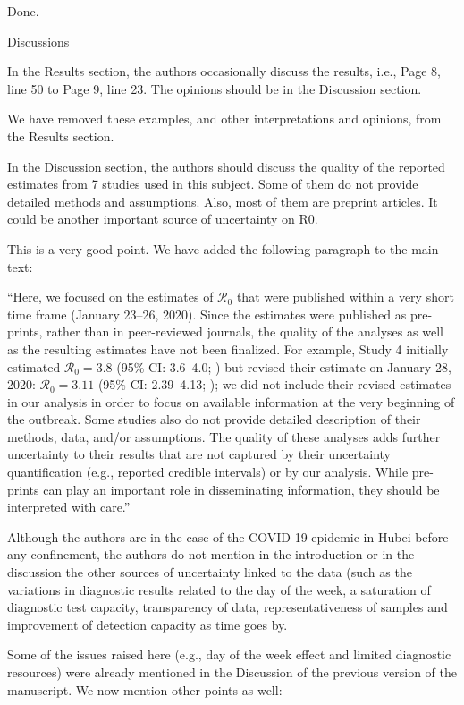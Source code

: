 \documentclass[12pt]{article}
\newcommand{\Ro}{\ensuremath{{\mathcal R}_{0}}\xspace}
\newcommand{\revtext}{\textsf}
\begin{document}
Done.

\revtext{Discussions}

\revtext{In the Results section, the authors occasionally discuss the results, i.e., Page 8, line 50 to Page
9, line 23. The opinions should be in the Discussion section.}

We have removed these examples, and other interpretations and opinions, from the Results section.

\revtext{In the Discussion section, the authors should discuss the quality of the reported estimates from
7 studies used in this subject. Some of them do not provide detailed methods and assumptions.
Also, most of them are preprint articles. It could be another important source of uncertainty on
R0.}

This is a very good point. We have added the following paragraph to the main text:

``Here, we focused on the estimates of \Ro that were published within a very short time frame (January 23--26, 2020).
Since the estimates were published as pre-prints, rather than in peer-reviewed journals, the quality of the analyses as well as the resulting estimates have not been finalized.
For example, Study 4 initially estimated $\Ro = 3.8$ (95\% CI: 3.6--4.0; \cite{readncov}) but revised their estimate on January 28, 2020: $\Ro = 3.11$ (95\% CI: 2.39--4.13; \cite{readncov2});
we did not include their revised estimates in our analysis in order to focus on available information at the very beginning of the outbreak.
Some studies also do not provide detailed description of their methods, data, and/or assumptions.
The quality of these analyses adds further uncertainty to their results that are not captured by their uncertainty quantification (e.g., reported credible intervals) or by our analysis.
While pre-prints can play an important role in disseminating information, they should be interpreted with care.''

\revtext{Although the authors are in the case of the COVID-19 epidemic in Hubei before any
confinement, the authors do not mention in the introduction or in the discussion the other
sources of uncertainty linked to the data (such as the variations in diagnostic results related to
the day of the week, a saturation of diagnostic test capacity, transparency of data,
representativeness of samples and improvement of detection capacity as time goes by.}

Some of the issues raised here (e.g., day of the week effect and limited diagnostic resources) were already mentioned in the Discussion of the previous version of the manuscript. We now mention other points as well:
\end{document}
